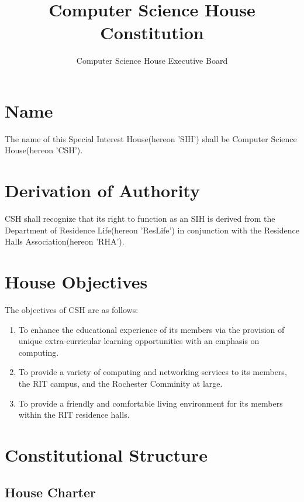 \documentclass{article}
\title{Computer Science House Constitution}
\author{Computer Science House Executive Board}
\date{\datechanged}
\newcommand{\article}[1]{\section{#1} \label{#1}}
\newcommand{\asection}[1]{\subsection{#1} \label{#1}}
\begin{document}
\maketitle

\article{Name}
The name of this Special Interest House(hereon 'SIH') shall be Computer Science House(hereon 'CSH').

\article{Derivation of Authority}
CSH shall recognize that its right to function as an SIH is derived from the Department of Residence Life(hereon 'ResLife') in conjunction with the Residence Halls Association(hereon 'RHA').

\article{House Objectives}
The objectives of CSH are as follows:
	\begin{enumerate}
	\item To enhance the educational experience of its members via the provision of unique extra-curricular learning opportunities with an emphasis on computing.
	\item To provide a variety of computing and networking services to its members, the RIT campus, and the Rochester Comminity at large.
	\item To provide a friendly and comfortable living environment for its members within the RIT residence halls.
\end{enumerate}

\article{Constitutional Structure}
\asection{House Charter}
\end{document}
